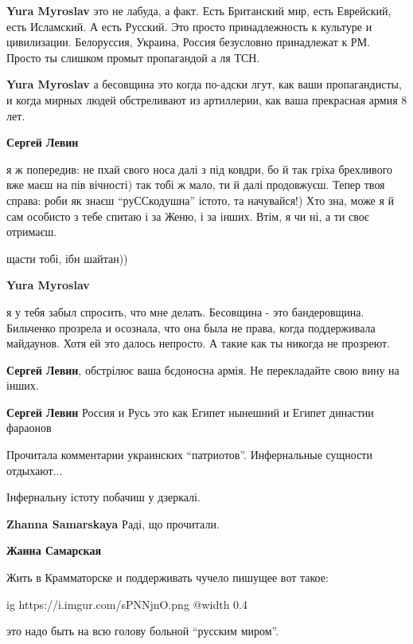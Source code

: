 \begin{itemize}
\begin{itemize}
\textbf{Yura Myroslav} это не лабуда, а факт. Есть Британский мир, есть Еврейский, есть Исламский. А есть Русский. Это просто принадлежность к культуре и цивилизации. Белоруссия, Украина, Россия безусловно принадлежат к РМ.
Просто ты слишком промыт пропагандой а ля ТСН.

\textbf{Yura Myroslav} а бесовщина это когда по-адски лгут, как ваши пропагандисты, и когда мирных людей обстреливают из артиллерии, как ваша прекрасная армия 8 лет.

\textbf{Сергей Левин} 

я ж попередив: не пхай свого носа далі з під ковдри, бо й так гріха брехливого
вже маєш на пів вічності) так тобі ж мало, ти й далі продовжуєш. Тепер твоя
справа: роби як знаєш \enquote{руССкодушна} істото, та начувайся!) Хто зна, може я й
сам особисто з тебе спитаю і за Женю, і за інших. Втім, я чи ні, а ти своє
отримаєш.

щасти тобі, ібн шайтан))

\textbf{Yura Myroslav} 

я у тебя забыл спросить, что мне делать. Бесовщина - это бандеровщина.
Бильченко прозрела и осознала, что она была не права, когда поддерживала
майдаунов. Хотя ей это далось непросто. А такие как ты никогда не прозреют.

\textbf{Сергей Левин}, обстрілює ваша бєдоносна армія. Не перекладайте свою вину на інших.

\textbf{Сергей Левин} Россия и Русь это как Египет нынешний и Египет династии фараонов

\end{itemize} %

Прочитала комментарии украинских \enquote{патриотов}. Инфернальные сущности отдыхают...

\begin{itemize} %
Інфернальну істоту побачиш у дзеркалі.

\textbf{Zhanna Samarskaya} Раді, що прочитали.

\textbf{Жанна Самарская} 

Жить в Крамматорске и поддерживать чучело пишущее вот такое:

\ifcmt
  ig https://i.imgur.com/sPNNjnO.png
  @width 0.4
\fi

это надо быть
на всю голову больной \enquote{русским миром}.  


\end{itemize}
\end{itemize}
